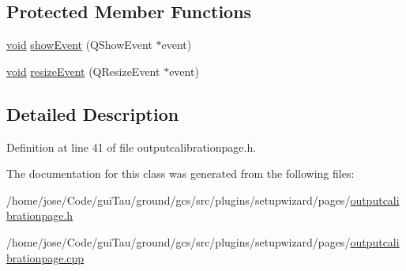 \subsection*{Protected Member Functions}
\begin{DoxyCompactItemize}
\item 
\hyperlink{group___u_a_v_objects_plugin_ga444cf2ff3f0ecbe028adce838d373f5c}{void} \hyperlink{group___output_calibration_page_gaccfd0563f0faafb93bacafa8cf873035}{show\-Event} (Q\-Show\-Event $\ast$event)
\item 
\hyperlink{group___u_a_v_objects_plugin_ga444cf2ff3f0ecbe028adce838d373f5c}{void} \hyperlink{group___output_calibration_page_gafa4831a5e77c0a3a03ad4e5869d4d601}{resize\-Event} (Q\-Resize\-Event $\ast$event)
\end{DoxyCompactItemize}


\subsection{Detailed Description}


Definition at line 41 of file outputcalibrationpage.\-h.



The documentation for this class was generated from the following files\-:\begin{DoxyCompactItemize}
\item 
/home/jose/\-Code/gui\-Tau/ground/gcs/src/plugins/setupwizard/pages/\hyperlink{outputcalibrationpage_8h}{outputcalibrationpage.\-h}\item 
/home/jose/\-Code/gui\-Tau/ground/gcs/src/plugins/setupwizard/pages/\hyperlink{outputcalibrationpage_8cpp}{outputcalibrationpage.\-cpp}\end{DoxyCompactItemize}
